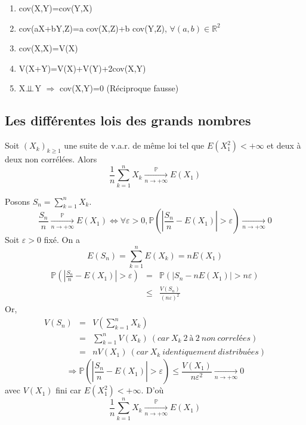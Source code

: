 \begin{Prop}
\begin{enumerate}
\item cov(X,Y)=cov(Y,X)
\item cov(aX+bY,Z)=a cov(X,Z)+b cov(Y,Z), $\forall(a,b)\in \mathbb{R}^2$
\item cov(X,X)=V(X)
\item V(X+Y)=V(X)+V(Y)+2cov(X,Y)
\item X$\perp \! \! \! \perp$Y $\Rightarrow$ cov(X,Y)=0 (Réciproque fausse)
\end{enumerate}
\end{Prop}

\subsection{Les différentes lois des grands nombres}
\begin{theo}
Soit $(X_k)_{k\geq 1}$ une suite de v.a.r. de même loi tel que $E(X_1^2)<+\infty$ et deux à deux non corrélées. Alors \[\frac{1}{n}\sum_{k=1}^n X_k \xrightarrow[n\to +\infty]{\mathbb{P}} E(X_1)\]
\end{theo}

\begin{dem}
Posons $S_n=\sum_{k=1}^n X_k$. 
\[\frac{S_n}{n} \xrightarrow[n\to +\infty]{\mathbb{P}} E(X_1) \Leftrightarrow \forall \varepsilon>0, \mathbb{P}\left(\left|\frac{S_n}{n}-E(X_1) \right|>\varepsilon\right)\xrightarrow[n\to +\infty]{}0\]
Soit $\varepsilon>0$ fixé. On a \[E(S_n)=\sum_{k=1}^n E(X_k)=nE(X_1)\]
\begin{eqnarray*}
\mathbb{P}\left(\left|\frac{S_n}{n}-E(X_1) \right|>\varepsilon\right) &=& \mathbb{P}\left(\left|S_n-nE(X_1) \right|>n\varepsilon\right) \\
&\leq& \frac{V(S_n)}{(n\varepsilon)^2}
\end{eqnarray*}
Or, \begin{eqnarray*}
V(S_n)&=&V(\sum_{k=1}^n X_k) \\
&=& \sum_{k=1}^n V(X_k)\ (car\ X_k\ 2\ à\ 2\ non\ correlées) \\
&=& nV(X_1)\ (car\ X_k\ identiquement\ distribuées)
\end{eqnarray*}
\[\Rightarrow \mathbb{P}\left(\left|\frac{S_n}{n}-E(X_1) \right|>\varepsilon\right) \leq \frac{V(X_1)}{n\varepsilon^2}\xrightarrow[n\to +\infty]{}0\]
avec $V(X_1)$ fini car $E(X_1^2)<+\infty$. D'où \[\frac{1}{n}\sum_{k=1}^n X_k \xrightarrow[n\to +\infty]{\mathbb{P}} E(X_1)\]
\end{dem}

